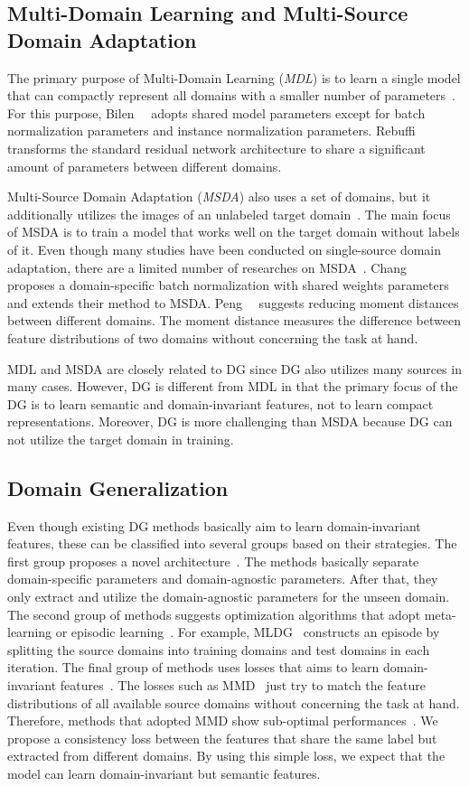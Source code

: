 \subsection{Multi-Domain Learning and Multi-Source Domain Adaptation}
The primary purpose of Multi-Domain Learning (\textit{MDL}) is to learn a single model that can compactly represent all domains with a smaller number of parameters~\cite{}. For this purpose, Bilen~\etal~\cite{} adopts shared model parameters except for batch normalization parameters and instance normalization parameters. Rebuffi~\etal~\cite{} transforms the standard residual network architecture to share a significant amount of parameters between different domains.

Multi-Source Domain Adaptation (\textit{MSDA}) also uses a set of domains, but it additionally utilizes the images of an unlabeled target domain~\cite{}. The main focus of MSDA is to train a model that works well on the target domain without labels of it. Even though many studies have been conducted on single-source domain adaptation, there are a limited number of researches on MSDA~\cite{}. Chang~\etal~\cite{} proposes a domain-specific batch normalization with shared weights parameters and extends their method to MSDA. Peng~\etal~\cite{} suggests reducing moment distances between different domains. The moment distance measures the difference between feature distributions of two domains without concerning the task at hand.

MDL and MSDA are closely related to DG since DG also utilizes many sources in many cases. However, DG is different from MDL in that the primary focus of the DG is to learn semantic and domain-invariant features, not to learn compact representations. Moreover, DG is more challenging than MSDA because DG can not utilize the target domain in training.


\subsection{Domain Generalization}
Even though existing DG methods basically aim to learn domain-invariant features, these can be classified into several groups based on their strategies. The first group proposes a novel architecture~\cite{}. The methods basically separate domain-specific parameters and domain-agnostic parameters. After that, they only extract and utilize the domain-agnostic parameters for the unseen domain. The second group of methods suggests optimization algorithms that adopt meta-learning or episodic learning~\cite{}. For example, MLDG~\cite{} constructs an episode by splitting the source domains into training domains and test domains in each iteration. The final group of methods uses losses that aims to learn domain-invariant features~\cite{}. The losses such as MMD~\cite{} just try to match the feature distributions of all available source domains without concerning the task at hand. Therefore, methods that adopted MMD show sub-optimal performances~\cite{}. We propose a consistency loss between the features that share the same label but extracted from different domains. By using this simple loss, we expect that the model can learn domain-invariant but semantic features.